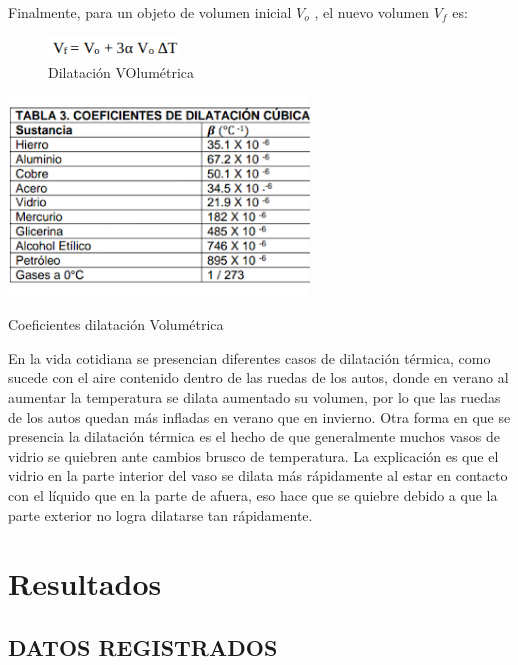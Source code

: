 \documentclass[journal,transmag]{IEEEtran}
\begin{document}
	Finalmente, para un objeto de volumen inicial $V_{o}$ , el nuevo volumen $V_{f}$ es: 
	\begin{figure}[!h]
		\center
		\includegraphics[width=3.5cm]{eq4.png}
		\caption{Dilatación VOlumétrica}
		\label{3}
		\end{figure}
		
	\begin{table}[!h]
\center
\includegraphics[width=8cm]{table3.png}
\caption{Coeficientes dilatación Volumétrica}
\label{T3}
\end{table}	
		
		En la vida cotidiana se presencian diferentes casos de dilatación térmica, como sucede con el aire contenido dentro de las ruedas de los autos, donde en verano al aumentar la temperatura se dilata aumentado su volumen, por lo que las ruedas de los autos quedan más infladas en verano que en invierno. Otra forma en que se presencia la dilatación térmica es el hecho de que generalmente muchos vasos de vidrio se quiebren ante cambios brusco de temperatura. La explicación es que el vidrio en la parte interior del vaso se dilata más rápidamente al estar en contacto con el líquido que en la parte de afuera, eso hace que se quiebre debido a que la parte exterior no logra dilatarse tan rápidamente.
		
		
	

 
\section{Resultados} 

\subsection{DATOS REGISTRADOS} 

  
\end{document}
